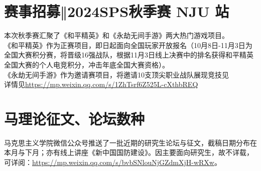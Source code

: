 \documentclass[letterpaper, 12pt]{article}
\begin{document}
\begin{multicols}{2}
\section{赛事招募‖2024SPS秋季赛 NJU 站}
本次秋季赛汇聚了《和平精英》和《永劫无间手游》两大热门游戏项目。\\
《和平精英》作为正赛项目，即日起面向全国玩家开放报名（10月8日-11月3日为全国大赛积分赛，将晋级16强战队，根据11月3日线上决赛中的排名获得和平精英全国大赛的个人电竞积分，冲击年底全国大赛资格）。\\
《永劫无间手游》作为邀请赛项目，将邀请10支顶尖职业战队展现竞技见\\
详情见\url{https://mp.weixin.qq.com/s/1ZhTsrf6Z525L-cXthbREQ}
\section{马理论征文、论坛数种}
马克思主义学院微信公众号推送了一批近期的研究生论坛与征文，截稿日期分布在本月与下月；亦有线上讲座《新中国国防建设》。因主要面向研究生，故不详载，可详阅：\url{https://mp.weixin.qq.com/s/bvbSNlouNjGZdmXjH-wRXw}。
\end{multicols} 
\end{document}
